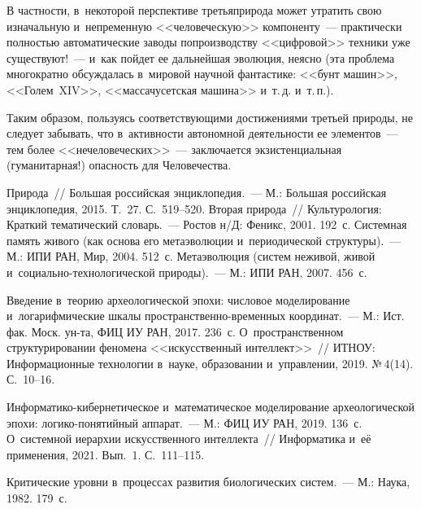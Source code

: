 \begin{multicols}{2}
  В частности, в~некоторой перспективе третья\linebreak природа может утратить свою 
изначальную и~непременную <<человеческую>> компоненту~--- прак\-тически 
полностью автоматические заводы по\linebreak производству <<циф\-ро\-вой>> техники 
уже существуют!~--- и~как пойдет ее дальнейшая эволюция, неясно (эта  
проб\-ле\-ма многократно обсуждалась в~мировой научной фантастике: <<бунт 
машин>>, <<Голем~XIV>>, <<массачусетская машина>> и~т.\,д. и~т.\,п.).
  
  Таким образом, пользуясь соответствующими достижениями третьей 
природы, не следует забывать, что в~активности автономной \mbox{деятельности} ее 
элементов~--- тем более <<нечеловеческих>>~--- заключается 
экзистенциальная (гуманитарная!) опасность для Человечества.
  
{\small\frenchspacing
 {%
 \begin{thebibliography}{9}
 Природа~// Большая российская энциклопедия.~--- М.: Большая 
российская энциклопедия, 2015. Т.~27. С.~519--520.
 Вторая природа~// Культурология: Краткий тематический словарь.~--- 
Ростов н/Д: Феникс, 2001. 192~с.
 Системная память живого (как основа его метаэволюции 
и~периодической структуры).~--- М.: ИПИ РАН, Мир, 2004. 512~с.
 Метаэволюция (сис\-тем неживой, живой  
и~со\-ци\-аль\-но-тех\-но\-ло\-ги\-че\-ской природы).~--- М.: ИПИ РАН, 2007. 456~с.

 Введение в~теорию археологической эпохи: числовое 
моделирование и~логарифмические шкалы про\-стран\-ст\-вен\-но-вре\-мен\-ных 
координат.~--- М.: Ист. фак. Моск. ун-та, ФИЦ ИУ РАН, 2017. 236~с.
 О~пространственном структурировании феномена <<искусственный 
интеллект>>~// ИТНОУ: Информационные технологии в~науке, образовании  
и~управ\-ле\-нии, 2019. №\,4(14). С.~10--16.

Ин\-фор\-ма\-ти\-ко-ки\-бер\-не\-ти\-че\-ское и~математическое моделирование 
археологической эпохи: ло\-ги\-ко-по\-ня\-тий\-ный аппарат.~--- М.: ФИЦ ИУ РАН, 2019. 
136~с.
 О~сис\-тем\-ной иерархии искусственного интеллекта~// 
Информатика и~её применения, 2021. Вып.~1. С.~111--115.


 Критические уровни в~процессах развития 
биологических систем.~--- М.: Наука, 1982. 179~с.
\end{thebibliography}

 }
 }

\end{multicols}

